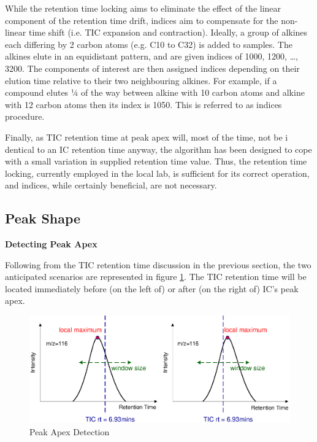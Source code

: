 While the retention time locking aims to eliminate the effect of the linear 
component of the retention time drift, indices aim to compensate for the 
non-linear time shift (i.e. TIC expansion and contraction). Ideally, a group 
of alkines each differing by 2 carbon atoms (e.g. C10 to C32) is added to 
samples. The alkines elute in an equidistant pattern, and are given indices of 
1000, 1200, …, 3200. The components of interest are then assigned indices 
depending on their elution time relative to their two neighbouring alkines. For 
example, if a compound elutes ¼ of the way between alkine with 10 carbon atoms 
and alkine with 12 carbon atoms then its index is 1050. This is referred to as 
indices procedure.

Finally, as TIC retention time at peak apex will, most of the time, not be i
dentical to an IC retention time anyway, the algorithm has been designed to 
cope with a small variation in supplied retention time value. Thus, the 
retention time locking, currently employed in the local lab, is sufficient 
for its correct operation, and indices, while certainly beneficial, are not 
necessary.

\subsection{Peak Shape}

{\bf Detecting Peak Apex}

Following from the TIC retention time discussion in the previous section,
the two anticipated scenarios are represented in figure \ref{fig:83}. The
TIC retention time will be located immediately before (on the left of)
or after (on the right of) IC’s peak apex.

\begin{figure}
  \begin{center}
    \includegraphics[scale=0.7]{graphics/chapter08/83.eps}
  \end{center}
  \caption{Peak Apex Detection}
  \label{fig:83}
\end{figure}

